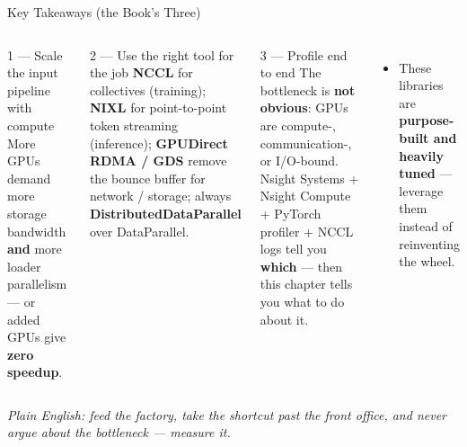 \documentclass[aspectratio=169]{beamer}
\newcommand{\kw}[1]{\textbf{\textcolor{kwblue}{#1}}}
\newcommand{\pe}[1]{\par{\setlength{\fboxsep}{2.5pt}\noindent\colorbox{navy!9}{\parbox{\dimexpr\textwidth-5pt\relax}{\footnotesize\itshape Plain English: #1}}}}
\begin{document}
\begin{frame}{Key Takeaways (the Book's Three)}
  \begin{columns}[t]
    \begin{block}{1 --- Scale the input pipeline with compute}
      \small More GPUs demand more storage bandwidth \kw{and} more loader parallelism ---
      or added GPUs give \kw{zero speedup}.
    \end{block}
    \begin{block}{2 --- Use the right tool for the job}
      \small \kw{NCCL} for collectives (training); \kw{NIXL} for point-to-point token
      streaming (inference); \kw{GPUDirect RDMA / GDS} remove the bounce buffer for
      network / storage; always \kw{DistributedDataParallel} over DataParallel.
    \end{block}
    \begin{block}{3 --- Profile end to end}
      \small The bottleneck is \kw{not obvious}: GPUs are compute-, communication-, or
      I/O-bound. Nsight Systems + Nsight Compute + PyTorch profiler + NCCL logs tell you
      \kw{which} --- then this chapter tells you what to do about it.
    \end{block}
    \begin{itemize}\small
      \item These libraries are \kw{purpose-built and heavily tuned} --- leverage them
            instead of reinventing the wheel.
    \end{itemize}
  \end{columns}
  \pe{feed the factory, take the shortcut past the front office, and never argue about the bottleneck --- measure it.}
\end{frame}
\end{document}
